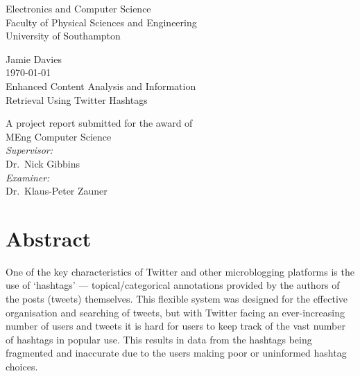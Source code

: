 \documentclass[11pt,a4paper]{report}
\begin{document}
\begin{titlepage}
\center
\vspace*{3cm}

{\Large
    Electronics and Computer Science\\
    Faculty of Physical Sciences and Engineering\\
    University of Southampton\\[1cm]
}

Jamie Davies\\
\today\\[1cm]

{\large
    Enhanced Content Analysis and Information\\
    Retrieval Using Twitter Hashtags\\[1cm]
}

A project report submitted for the award of\\
MEng Computer Science\\[1cm]

\emph{Supervisor:}\\
Dr.\ Nick Gibbins\\[0.5cm]

\emph{Examiner:}\\
Dr.\ Klaus-Peter Zauner\\


\vfill
\end{titlepage}

\section*{Abstract}
One of the key characteristics of Twitter and other microblogging platforms is the use of `hashtags' --- topical/categorical annotations provided by the authors of the posts (tweets) themselves. This flexible system was designed for the effective organisation and searching of tweets, but with Twitter facing an ever-increasing number of users and tweets it is hard for users to keep track of the vast number of hashtags in popular use. This results in data from the hashtags being fragmented and inaccurate due to the users making poor or uninformed hashtag choices.
\end{document}
